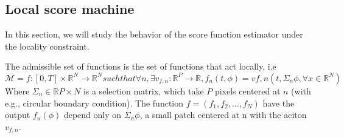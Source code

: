 \documentclass[a4paper,10pt]{article}
\theoremstyle{definition} %
\theoremstyle{definition} %
\theoremstyle{definition} %
\theoremstyle{definition} %
\newcommand{\R}{\mathbb{R}}
\begin{document}





\subsection{Local score machine}

In this section, we will study the behavior of the score function estimator under the locality constraint.

The admissible set of functions is the set of functions that act locally, i.e 
\begin{equation*}
    \mathcal{M} = {f:[0,T]\times\R^N \rightarrow \R^N such that \forall n, \exists v_{f,n} : \R^P \rightarrow \R, f_n(t,\phi)=v{f,n}(t,\Sigma_n \phi, \forall x\in \R^N)}
\end{equation*}
Where $\Sigma_n \in \R{P\times N}$ is a selection matrix, which take $P$ pixels centered at $n$ (with e.g., circular boundary condition). The function $f = (f_1,f_2,\dots,f_N)$ have the output $f_n(\phi)$ depend only on $\Sigma_n \phi$, a small patch centered at n with the aciton $v_{f,n}$.
\end{document}
